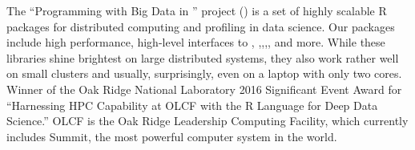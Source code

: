 The ``Programming with Big Data in \R'' project () is a set of highly
scalable R packages for distributed computing and profiling in data
science. Our packages include high performance, high-level interfaces to
, ,,,, and more. While these libraries
shine brightest on large distributed systems, they also work rather well
on small clusters and usually, surprisingly, even on a laptop with only
two cores. Winner of the Oak Ridge National Laboratory 2016 Significant
Event Award for ``Harnessing HPC Capability at OLCF with the R Language
for Deep Data Science.'' OLCF is the Oak Ridge Leadership Computing
Facility, which currently includes Summit, the most powerful computer
system in the world.
